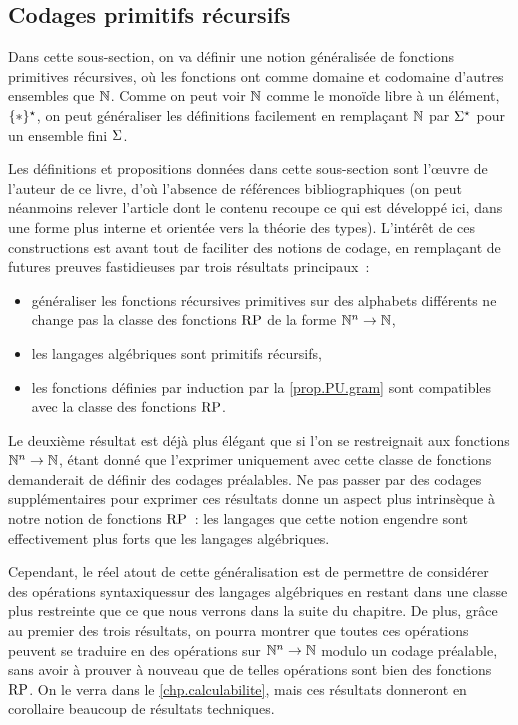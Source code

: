 \subsection{Codages primitifs récursifs}

Dans cette sous-section, on va définir une notion généralisée de fonctions
primitives récursives, où les fonctions ont comme domaine et codomaine d'autres
ensembles que $\mathbb N$. Comme on peut voir $\mathbb N$ comme le monoïde libre à un
élément, $\{*\}^{\star}$, on peut généraliser les définitions facilement en
remplaçant $\mathbb N$ par $\Sigma^{\star}$ pour un ensemble fini $\Sigma$.

Les définitions et propositions données dans cette sous-section sont l'\oe uvre
de l'auteur de ce livre, d'où l'absence de références bibliographiques (on
peut néanmoins relever l'article
\cite{BuchholtzSchippvonBranitz2024} dont le contenu recoupe
ce qui est développé ici, dans une forme plus interne et orientée vers la
théorie des types).
L'intérêt de ces constructions est avant tout de faciliter des notions de
codage, en remplaçant de futures preuves fastidieuses par trois résultats
principaux~:
\begin{itemize}
\item généraliser les fonctions récursives primitives sur des alphabets
  différents ne change pas la classe des fonctions $\operatorname{RP}$ de la forme
  $\mathbb N^n\to\mathbb N$,
\item les langages algébriques sont primitifs récursifs,
\item les fonctions définies par induction par la \cref{prop.PU.gram} sont
  compatibles avec la classe des fonctions $\operatorname{RP}$.
\end{itemize}
Le deuxième résultat est déjà plus élégant que si l'on se restreignait aux
fonctions $\mathbb N^n \to \mathbb N$, étant donné que l'exprimer uniquement avec cette
classe de fonctions demanderait de définir des codages préalables. Ne pas passer
par des codages supplémentaires pour exprimer ces résultats donne un aspect plus
intrinsèque à notre notion de fonctions $\operatorname{RP}$~: les langages que cette notion
engendre sont effectivement plus forts que les langages algébriques.

Cependant, le réel atout de cette généralisation est de permettre de considérer
des opérations \og syntaxiques\fg sur des langages algébriques en restant dans
une classe plus restreinte que ce que nous verrons dans la suite du chapitre.
De plus, grâce au premier des trois résultats, on pourra montrer que toutes ces
opérations peuvent se traduire en des opérations sur $\mathbb N^n \to \mathbb N$ modulo un
codage préalable, sans avoir à prouver à nouveau que de telles opérations sont
bien des fonctions $\operatorname{RP}$. On le verra dans le \cref{chp.calculabilite}, mais
ces résultats donneront en corollaire beaucoup de résultats techniques.

